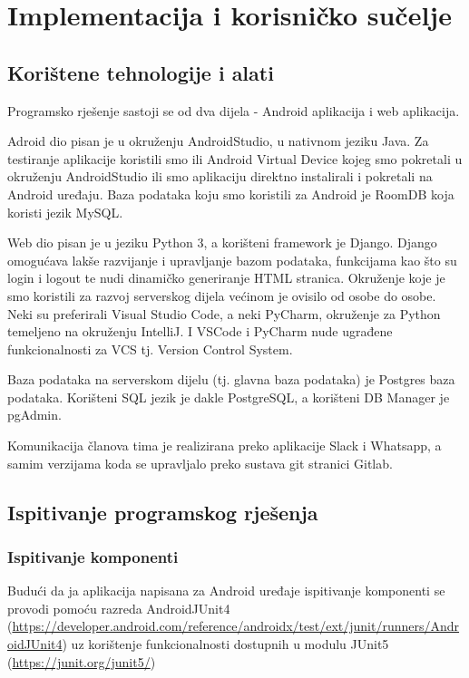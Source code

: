 \chapter{Implementacija i korisničko sučelje}
	\section{Korištene tehnologije i alati}
		Programsko rješenje sastoji se od dva dijela - Android aplikacija i web aplikacija.
		
		Adroid dio pisan je u okruženju AndroidStudio, u nativnom jeziku Java. Za testiranje aplikacije koristili smo ili Android Virtual Device kojeg smo pokretali u okruženju AndroidStudio ili smo aplikaciju direktno instalirali i pokretali na Android uređaju. Baza podataka koju smo koristili za Android je RoomDB koja koristi jezik MySQL.
		
		Web dio pisan je u jeziku Python 3, a korišteni framework je Django. Django omogućava lakše razvijanje i upravljanje bazom podataka, funkcijama kao što su login i logout te nudi dinamičko generiranje HTML stranica. Okruženje koje je smo koristili za razvoj serverskog dijela većinom je ovisilo od osobe do osobe. Neki su preferirali Visual Studio Code, a neki PyCharm, okruženje za Python temeljeno na okruženju IntelliJ. I VSCode i PyCharm nude ugrađene funkcionalnosti za VCS tj. Version Control System.
		
		Baza podataka na serverskom dijelu (tj. glavna baza podataka) je Postgres baza podataka. Korišteni SQL jezik je dakle PostgreSQL, a korišteni DB Manager je pgAdmin.
		
		Komunikacija članova tima je realizirana preko aplikacije Slack i Whatsapp, a samim verzijama koda se upravljalo preko sustava git stranici Gitlab.
		\eject
	\section{Ispitivanje programskog rješenja}
		\subsection{Ispitivanje komponenti}
			
			Budući da ja aplikacija napisana za Android uređaje ispitivanje komponenti
			se provodi pomoću razreda AndroidJUnit4 (\url{https://developer.android.com/reference/androidx/test/ext/junit/runners/AndroidJUnit4})
			uz korištenje funkcionalnosti dostupnih u modulu JUnit5 (\url{https://junit.org/junit5/})
			
